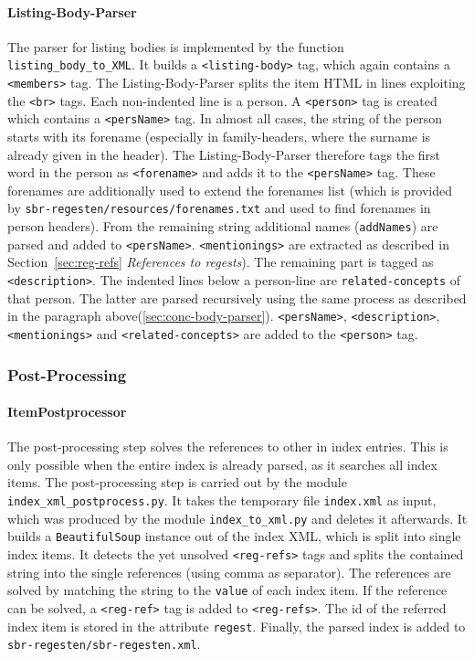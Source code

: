 \paragraph{Listing-Body-Parser}
The parser for listing bodies is implemented by the function \texttt{listing\_body\_to\_XML}. It builds a \texttt{<listing-body>} tag, which again contains a \texttt{<members>} tag. The Listing-Body-Parser splits the item HTML in lines exploiting the \texttt{<br>} tags. Each non-indented line is a person. A \texttt{<person>} tag is created which contains a \texttt{<persName>} tag. In almost all cases, the string of the person starts with its forename (especially in family-headers, where the surname is already given in the header). The Listing-Body-Parser therefore tags the first word in the person as \texttt{<forename>} and adds it to the \texttt{<persName>} tag. These forenames are additionally used to extend the forenames list (which is provided by \texttt{sbr-regesten/resources/forenames.txt} and used to find forenames in person headers). From the remaining string additional names (\texttt{addNames}) are parsed and added to \texttt{<persName>}. \texttt{<mentionings>} are extracted as described in Section~\ref{sec:reg-refs} \textit{References to regests}). The remaining part is tagged as \texttt{<description>}. The indented lines below a person-line are \texttt{related-concepts} of that person. The latter are parsed recursively using the same process as described in the paragraph above(\ref{sec:conc-body-parser}). \texttt{<persName>}, \texttt{<description>}, \texttt{<mentionings>} and \texttt{<related-concepts>} are added to the \texttt{<person>} tag.


\subsubsection{Post-Processing}

\paragraph{ItemPostprocessor}
\label{sec:postproc}
The post-processing step solves the references to other in index entries. This is only possible when the entire index is already parsed, as it searches all index items. The post-processing step is carried out by the module \texttt{index\_xml\_postprocess.py}. It takes the temporary file \texttt{index.xml} as input, which was produced by the module \texttt{index\_to\_xml.py} and deletes it afterwards. It builds a \texttt{BeautifulSoup} instance out of the index XML, which is split into single index items. It detects the yet unsolved \texttt{<reg-refs>} tags and splits the contained string into the single references (using comma as separator). The references are solved by matching the string to the \texttt{value} of each index item. If the reference can be solved, a \texttt{<reg-ref>} tag is added to \texttt{<reg-refs>}. The id of the referred index item is stored in the attribute \texttt{regest}. Finally, the parsed index is added to \texttt{sbr-regesten/sbr-regesten.xml}.

